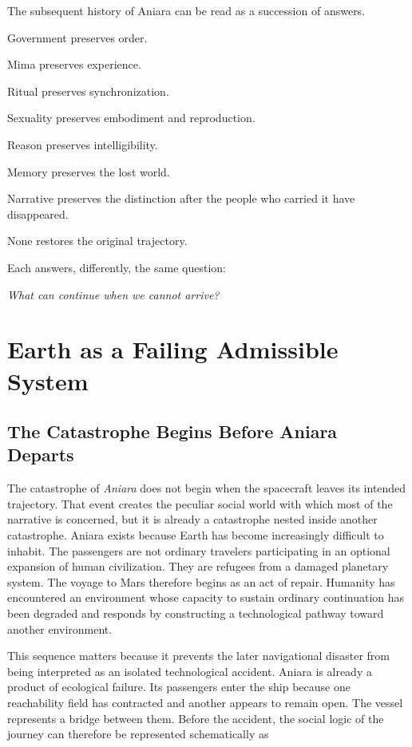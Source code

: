 \documentclass[11pt,oneside]{book}
\theoremstyle{definition}
\theoremstyle{remark}
\begin{document}
The subsequent history of Aniara can be read as a succession of answers.

Government preserves order.

Mima preserves experience.

Ritual preserves synchronization.

Sexuality preserves embodiment and reproduction.

Reason preserves intelligibility.

Memory preserves the lost world.

Narrative preserves the distinction after the people who carried it have disappeared.

None restores the original trajectory.

Each answers, differently, the same question:

\begin{center}
\emph{What can continue when we cannot arrive?}
\end{center}

\chapter{Earth as a Failing Admissible System}

\section{The Catastrophe Begins Before Aniara Departs}

The catastrophe of \emph{Aniara} does not begin when the spacecraft leaves its intended trajectory. That event creates the peculiar social world with which most of the narrative is concerned, but it is already a catastrophe nested inside another catastrophe. Aniara exists because Earth has become increasingly difficult to inhabit. The passengers are not ordinary travelers participating in an optional expansion of human civilization. They are refugees from a damaged planetary system. The voyage to Mars therefore begins as an act of repair. Humanity has encountered an environment whose capacity to sustain ordinary continuation has been degraded and responds by constructing a technological pathway toward another environment.

This sequence matters because it prevents the later navigational disaster from being interpreted as an isolated technological accident. Aniara is already a product of ecological failure. Its passengers enter the ship because one reachability field has contracted and another appears to remain open. The vessel represents a bridge between them. Before the accident, the social logic of the journey can therefore be represented schematically as
\end{document}
